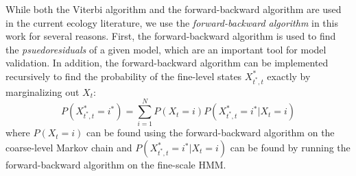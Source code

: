 While both the Viterbi algorithm and the forward-backward algorithm are used in the current ecology literature, we use the \textit{forward-backward algorithm} in this work for several reasons. First, the forward-backward algorithm is used to find the \textit{psuedoresiduals} of a given model, which are an important tool for model validation. In addition, the forward-backward algorithm can be implemented recursively to find the probability of the fine-level states $X^*_{t^*,t}$ exactly by marginalizing out $X_t$:
%
$$P(X^*_{t^*,t} = i^*) = \sum_{i=1}^N P(X_t = i)P(X^*_{t^*,t} = i^* | X_t = i)$$
%
where $P(X_t = i)$ can be found using the forward-backward algorithm on the coarse-level Markov chain and $P(X^*_{t^*,t} = i^* | X_t = i)$ can be found by running the forward-backward algorithm on the fine-scale HMM.